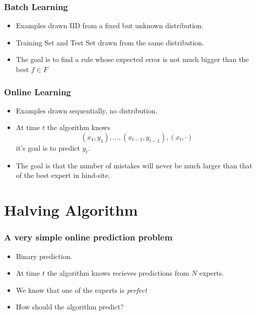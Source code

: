 \documentclass[handout]{beamer}
\begin{document}
\begin{frame}
\frametitle{Batch Learning}
\begin{itemize}
\item Examples drawn IID from a fixed but unknown
  distribution. 
\item Training Set and Test Set drawn from the same distribution.
\item The goal is to find a rule whose expected error is not much
  bigger than the best $f \in F$
\end{itemize}
\end{frame}

\begin{frame}
\frametitle{Online Learning}
\begin{itemize}
\item Examples drawn sequentially, no distribution.
\item At time $t$ the algorithm knows
$$(x_1,y_1),\ldots,(x_{t-1},y_{t-1}),(x_t,\cdot)$$
it's goal is to predict $y_t$.
\item The goal is that the number of mistakes will never be much
  larger than that of the best expert in hind-site.
\end{itemize}
\end{frame}

\section{Halving Algorithm}

\begin{frame}
\frametitle{A very simple online prediction problem}
\begin{itemize}
\item Binary prediction.
\item At time $t$ the algorithm knows recieves predictions from $N$ experts.
\item We know that one of the experts is {\em perfect}
\item How should the algorithm predict?
\end{itemize}
\end{frame}
\end{document}
